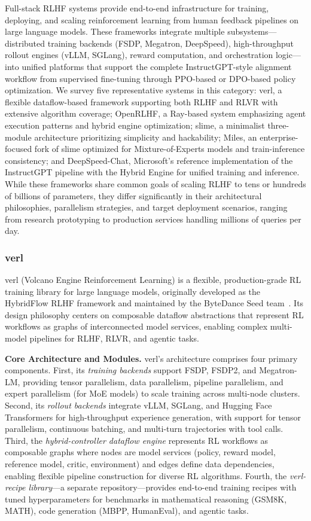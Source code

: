 \documentclass[conference]{IEEEtran}
\begin{document}
Full-stack RLHF systems provide end-to-end infrastructure for training, deploying, and scaling reinforcement learning from human feedback pipelines on large language models. These frameworks integrate multiple subsystems—distributed training backends (FSDP, Megatron, DeepSpeed), high-throughput rollout engines (vLLM, SGLang), reward computation, and orchestration logic—into unified platforms that support the complete InstructGPT-style alignment workflow from supervised fine-tuning through PPO-based or DPO-based policy optimization. We survey five representative systems in this category: verl, a flexible dataflow-based framework supporting both RLHF and RLVR with extensive algorithm coverage; OpenRLHF, a Ray-based system emphasizing agent execution patterns and hybrid engine optimization; slime, a minimalist three-module architecture prioritizing simplicity and hackability; Miles, an enterprise-focused fork of slime optimized for Mixture-of-Experts models and train-inference consistency; and DeepSpeed-Chat, Microsoft's reference implementation of the InstructGPT pipeline with the Hybrid Engine for unified training and inference. While these frameworks share common goals of scaling RLHF to tens or hundreds of billions of parameters, they differ significantly in their architectural philosophies, parallelism strategies, and target deployment scenarios, ranging from research prototyping to production services handling millions of queries per day.

\subsubsection{verl}

verl (Volcano Engine Reinforcement Learning) is a flexible, production-grade RL training library for large language models, originally developed as the HybridFlow RLHF framework and maintained by the ByteDance Seed team~\cite{verl-github, verl-paper}. Its design philosophy centers on composable dataflow abstractions that represent RL workflows as graphs of interconnected model services, enabling complex multi-model pipelines for RLHF, RLVR, and agentic tasks.

\textbf{Core Architecture and Modules.} verl's architecture comprises four primary components. First, its \textit{training backends} support FSDP, FSDP2, and Megatron-LM, providing tensor parallelism, data parallelism, pipeline parallelism, and expert parallelism (for MoE models) to scale training across multi-node clusters. Second, its \textit{rollout backends} integrate vLLM, SGLang, and Hugging Face Transformers for high-throughput experience generation, with support for tensor parallelism, continuous batching, and multi-turn trajectories with tool calls. Third, the \textit{hybrid-controller dataflow engine} represents RL workflows as composable graphs where nodes are model services (policy, reward model, reference model, critic, environment) and edges define data dependencies, enabling flexible pipeline construction for diverse RL algorithms. Fourth, the \textit{verl-recipe library}—a separate repository—provides end-to-end training recipes with tuned hyperparameters for benchmarks in mathematical reasoning (GSM8K, MATH), code generation (MBPP, HumanEval), and agentic tasks.
\end{document}
